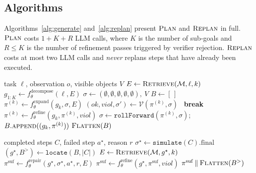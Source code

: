 \subsection{Algorithms}\label{sec:algorithm}

Algorithms~\ref{alg:generate} and~\ref{alg:replan} present
$\textsc{Plan}$ and $\textsc{Replan}$ in full.
$\textsc{Plan}$ costs $1 + K + R$ LLM calls, where $K$ is the number
of sub-goals and $R \leq K$ is the number of refinement passes
triggered by verifier rejection. $\textsc{Replan}$ costs at most two
LLM calls and \emph{never} replans steps that have already been
executed.

\begin{algorithm}
\caption{\textsc{Plan} — GRACE initial planning.}\label{alg:generate}
\begin{algorithmic}[1]
\Require task $\ell$, observation $o$, visible objects $V$
\State $E \gets \textsc{Retrieve}(\mathcal{M}, \ell, k)$
\State $g_{1:K} \gets f_\theta^{\text{decompose}}(\ell, E)$
\State $\sigma \gets (\emptyset, \emptyset, \emptyset, \emptyset, \emptyset),\ V$
\State $B \gets [\,]$
  \State $\pi^{(k)} \gets f_\theta^{\text{expand}}(g_k, \sigma, E)$
    \State $(\mathit{ok},\mathit{viol},\sigma') \gets \mathcal{V}(\pi^{(k)}, \sigma)$
    \ \textbf{break}\ \EndIf
    \State $\pi^{(k)} \gets f_\theta^{\text{refine}}(g_k, \pi^{(k)}, \mathit{viol})$
  \EndFor
  \State $\sigma \gets \texttt{rollForward}(\pi^{(k)}, \sigma)$;\
        $B.\textsc{append}((g_k, \pi^{(k)}))$
\EndFor
\State \Return $\textsc{Flatten}(B)$
\end{algorithmic}
\end{algorithm}

\begin{algorithm}
\caption{\textsc{Replan} — sub-goal--localised repair.}\label{alg:replan}
\begin{algorithmic}[1]
\Require completed steps $C$, failed step $a^\star$, reason $r$
\State $\sigma^\star \gets \texttt{simulate}(C).\mathrm{final}$
\State $(g^\star, B^{>}) \gets \texttt{locate}(B, |C|)$
\State $E \gets \textsc{Retrieve}(\mathcal{M}, g^\star, k)$
\State $\pi^{\text{suf}} \gets f_\theta^{\text{repair}}(g^\star,
       \sigma^\star, a^\star, r, E)$
  \State $\pi^{\text{suf}} \gets f_\theta^{\text{refine}}(g^\star,
         \pi^{\text{suf}}, \mathit{viol})$
\EndIf
\State \Return $\pi^{\text{suf}} \mathbin{\Vert} \textsc{Flatten}(B^{>})$
\end{algorithmic}
\end{algorithm}

